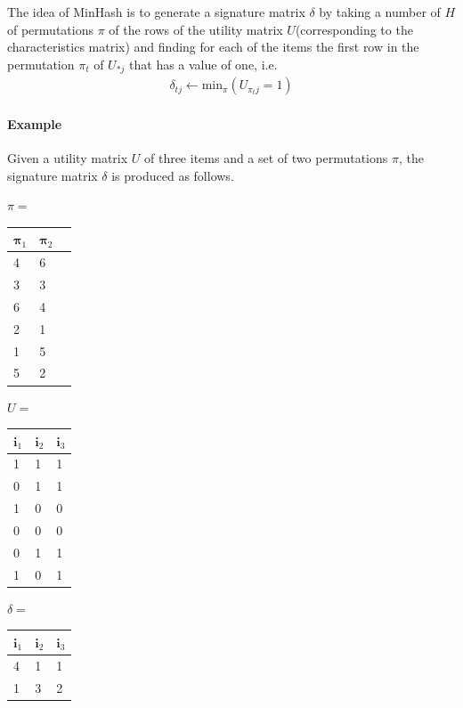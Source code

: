 The idea of MinHash is to generate a signature matrix $\delta$ by taking a number of $H$ of permutations $\pi$ of the rows of the utility matrix $U$(corresponding to the characteristics matrix) and finding for each of the items the first row in the permutation $\pi_t$ of $U_{*j}$ that has a value of one, i.e.
\begin{equation}
\begin{aligned}
\delta_{tj} \gets \text{min}_\pi (U_{\pi_tj} = 1)
\end{aligned}
\end{equation}



\paragraph{Example} Given a utility matrix $U$ of three items and a set of two permutations $\pi$, the signature matrix $\delta$ is produced as follows. 

\vspace{1em}
\begin{minipage}{0.3\linewidth}
    \centering
    $\pi=$
    \begin{tabular}{|l|l|l|}
    \hline
        \textbf{$\boldsymbol \pi_1$} & \textbf{$\boldsymbol \pi_2$} \\ \hline
        4 & 6 \\ \hline
        3 & 3 \\ \hline
        6 & 4 \\ \hline
        2 & 1 \\ \hline
        1 & 5 \\ \hline
        5 & 2 \\ \hline
    \end{tabular}
\end{minipage}
\begin{minipage}{0.3\linewidth}
    \centering
    $U=$
    \begin{tabular}{|l|l|l|}
    \hline
        \textbf{$\boldsymbol i_1$} & \textbf{$\boldsymbol i_2$} & \textbf{$\boldsymbol i_3$} \\ \hline
        1 & 1 & 1 \\ \hline
        0 & 1 & 1 \\ \hline
        1 & 0 & 0 \\ \hline
        0 & 0 & 0 \\ \hline
        0 & 1 & 1 \\ \hline
        1 & 0 & 1 \\ \hline
    \end{tabular}
\end{minipage}
\begin{minipage}{0.3\linewidth}
    \centering
    $\delta = $
    \begin{tabular}{|l|l|l|}
    \hline
        \textbf{$\boldsymbol i_1$} & \textbf{$\boldsymbol i_2$} & \textbf{$\boldsymbol i_3$} \\ \hline
        4 & 1 & 1 \\ \hline
        1 & 3 & 2 \\ \hline
    \end{tabular}
\end{minipage}


